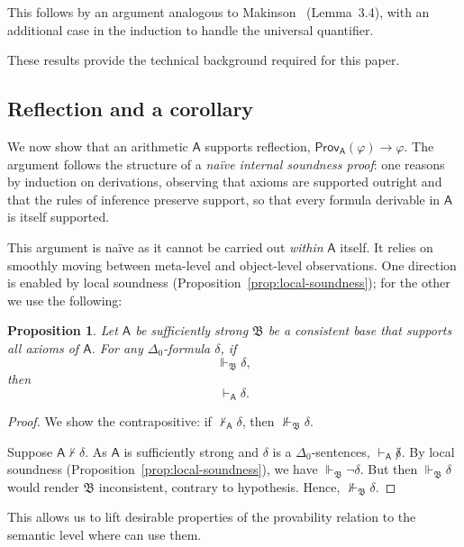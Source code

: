\documentclass[reqno]{asl}
\newtheorem{proposition}[definition]{Proposition}
\newcommand{\proves}{\vdash}
\newcommand{\supp}{\Vdash}
\newcommand{\base}[1]{\mathfrak{#1}}
\newcommand{\pa}{\textsf{A}}
\newcommand{\Prov}{\textsf{Prov}}
\begin{document}
This follows by an argument analogous to Makinson~\cite{Makinson_2014} 
(Lemma~3.4), with an additional case in the induction to handle the 
universal quantifier. 


These results provide the technical background required for this paper. 

\subsection*{Reflection and a corollary}

We now show that an arithmetic $\pa$ supports
reflection, $\Prov_{\pa}(\varphi) \to \varphi$. The argument follows the structure of a
\emph{na\"{i}ve internal soundness proof}: one reasons by induction on
derivations, observing that axioms are supported outright and that the
rules of inference preserve support, so that every formula derivable in
$\pa$ is itself supported.  

This argument is na\"{i}ve as it cannot be carried out \emph{within} $\pa$ itself. It relies on smoothly moving between meta-level and object-level observations. One direction is enabled by local soundness (Proposition~\ref{prop:local-soundness}); for the other we use the following:

\begin{proposition}\label{prop:equationally-complete}
    Let $\pa$ be sufficiently strong $\base{B}$ be a consistent base that supports all
axioms of $\pa$. For any $\Delta_0$-formula $\delta$, if
\[
    \supp_{\base{B}} \delta,
\]
then
\[
    \proves_{\pa} \delta.
\] 
\end{proposition}
\begin{proof}
We show the contrapositive: if $\not \vdash_{\pa} \delta$, then $\not \supp_{\base{B}} \delta$.

Suppose $\pa \not\proves \delta$. As $\pa$ is sufficiently strong and $\delta$ is a $\Delta_0$-sentences,
$\proves_{\pa} \not \delta$. By local soundness (Proposition~\ref{prop:local-soundness}), we
have $\supp_{\base{B}} \neg \delta$. But then $\supp_{\base{B}} \delta$
would render $\base{B}$ inconsistent, contrary to hypothesis. Hence,
$\not\supp_{\base{B}} \delta$. 
\end{proof}

This allows us to lift desirable properties of the provability relation to the semantic level where can use them. 
\end{document}
